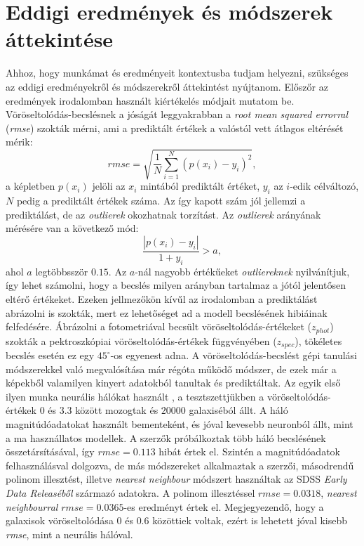 \documentclass[12pt,letterpaper,twoside,openright]{book}
\begin{document}
\section{Eddigi eredmények és módszerek áttekintése}
Ahhoz, hogy munkámat és eredményeit kontextusba tudjam helyezni, szükséges az eddigi eredményekről és módszerekről áttekintést nyújtanom. Előszőr az eredmények irodalomban használt kiértékelés módjait mutatom be.
\newline\indent
Vöröseltolódás-becslésnek a jóságát leggyakrabban a \textit{root mean squared errorral} (\textit{rmse}) szokták mérni, ami a prediktált értékek a valóstól vett átlagos eltérését mérik:
\begin{equation}
\textit{rmse} = \sqrt{\frac{1}{N}\sum^{N}_{i=1} (p(x_i)-y_i)^2},
\end{equation}
a képletben $p(x_i)$ jelöli az $x_i$ mintából prediktált értéket, $y_i$ az $i$-edik  célváltozó, $N$ pedig a prediktált értékek száma. Az így kapott szám jól jellemzi a prediktálást, de az \textit{outlierek} okozhatnak torzítást. Az \textit{outlierek} arányának mérésére van a következő mód:
\begin{equation}
\frac{|p(x_i)-y_i|}{1 + y_i} > a,
\end{equation}
 ahol $a$ legtöbbsször $0.15$. Az $a$-nál nagyobb értékűeket \textit{outliereknek} nyilvánítjuk, így lehet számolni, hogy a becslés milyen arányban tartalmaz a jótól jelentősen eltérő értékeket. Ezeken jellmezőkön kívűl az irodalomban a prediktálást abrázolni is szokták, mert ez lehetőséget ad a modell becslésének hibiáinak felfedésére. Ábrázolni a fotometriával becsült vöröseltolódás-értékeket ($z_{phot}$) szokták a pektroszkópiai vöröseltolódás-értékek függvényében ($z_{spec}$), tökéletes becslés esetén ez egy $45^{\circ}$-os egyenest adna. 
 \newline\indent
 A vöröseltolódás-becslést gépi tanulási módszerekkel való megvalósítása már régóta működő módszer, de ezek már a képekből valamilyen kinyert adatokból tanultak és prediktáltak. Az egyik első ilyen munka neurális hálókat használt \cite{ann1}, a tesztszettjükben a vöröseltolódás-értékek $0$ és $3.3$ között mozogtak és $\num{20000}$ galaxiséból állt. A háló magnitúdóadatokat használt bementeként, és  jóval kevesebb neuronból állt, mint a ma használlatos modellek. A szerzők próbálkoztak több háló becslésének összetársításával, így $\textit{rmse} = 0.113$ hibát értek el.
 \newline\indent
 Szintén a magnitúdóadatok felhasználásval dolgozva, de más módszereket alkalmaztak a \cite{mlrstwo} szerzői, másodrendű polinom illesztést, illetve \textit{nearest neighbour} módszert használtak az SDSS \textit{Early Data Releaséből} származó adatokra. A polinom illesztéssel $\textit{rmse} = 0.0318$, \textit{nearest neighbourral} $\textit{rmse} = 0.0365$-es eredményt értek el. Megjegyezendő, hogy a galaxisok vöröseltolódása $0$ és $0.6$ közöttiek voltak, ezért is lehetett jóval kisebb \textit{rmse}, mint a neurális hálóval.
\end{document}
